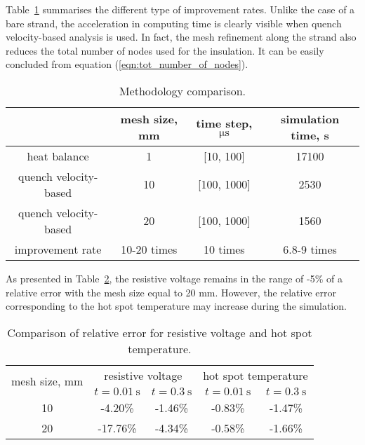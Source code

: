 
Table~\ref{table: 1d_qv_benchmarking_with_insulation_methods_comparison} summarises the different type of improvement rates. Unlike the case of a bare strand, the acceleration in computing time is clearly visible when quench velocity-based analysis is used. In fact, the mesh refinement along the strand also reduces the total number of nodes used for the insulation. It can be easily concluded from equation (\ref{eqn:tot_number_of_nodes}).

\begin{table}[H]
    \caption{Methodology comparison.} 
    \vspace{-1.em} 
    \fontsize{10}{10}
    \selectfont 
    \renewcommand{\arraystretch}{1.5}
    \begin{center}
        \begin{tabular}{ cccc }  
        \hline
          & mesh size, mm & time step, $\upmu \text{s}$ & simulation time, s\\
        \hline
        heat balance & 1 & [10, 100] & 17100 \\
        quench velocity-based & 10 & [100, 1000] & 2530 \\
        quench velocity-based & 20 & [100, 1000] & 1560 \\
        \hline 
        improvement rate & 10-20 times & 10 times & 6.8-9 times \\
        \end{tabular}
    \end{center}  
     \label{table: 1d_qv_benchmarking_with_insulation_methods_comparison} 
 \end{table}
 
As presented in Table~\ref{table: 1d_qv_benchmarking_with_insulation_res_and_hot_spot_error_conclusion}, the resistive voltage remains in the range of -5\% of a relative error with the mesh size equal to 20 mm. However, the relative error corresponding to the hot spot temperature may increase during the simulation. 

 \begin{table}[H]
    \caption{Comparison of relative error for resistive voltage and hot spot temperature.} 
    \vspace{-1.em} 
    \fontsize{10}{10}
    \selectfont 
    \renewcommand{\arraystretch}{1.5}
    \begin{center}
        \begin{tabular}{ c | cc | cc }  
        \hline
        \multirow{2}{*}{mesh size, mm} & \multicolumn{2}{c|}{resistive voltage} & \multicolumn{2}{c}{hot spot temperature} \\ 
           & $t=0.01~\text{s}$ & $t=0.3~\text{s}$ & $t=0.01~\text{s}$ & $t=0.3~\text{s}$ \\
        \hline
        10 & -4.20\% & -1.46\% & -0.83\% & -1.47\% \\
        20 & -17.76\% & -4.34\% & -0.58\% & -1.66\% \\
        \hline 
        \end{tabular}
    \end{center}  
     \label{table: 1d_qv_benchmarking_with_insulation_res_and_hot_spot_error_conclusion} 
 \end{table}
